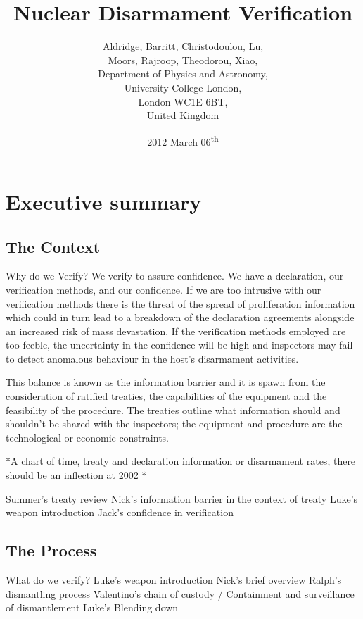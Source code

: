 \documentclass[a4paper]{article}
\begin{document}
\title{Nuclear Disarmament Verification}
\author{Aldridge, Barritt, Christodoulou, Lu, \\
	Moors, Rajroop, Theodorou, Xiao, \\
\small	Department of Physics and Astronomy, \\
\small	University College London, \\
\small	London WC1E 6BT, \\
\small	United Kingdom}
\date{2012 March 06\textsuperscript{th}}
\maketitle

\section*{Executive summary}
\subsection*{The Context}
Why do we Verify?
We verify to assure confidence. We have a declaration, our verification methods, 
and our confidence. If we are too intrusive with our verification methods there 
is the threat of the spread of proliferation information which could in turn lead 
to a breakdown of the declaration agreements alongside an increased risk of mass 
devastation. If the verification methods employed are too feeble, the uncertainty 
in the confidence will be high and inspectors may fail to detect anomalous 
behaviour in the host’s disarmament activities.

This balance is known as the information barrier and it is spawn from the 
consideration of ratified treaties, the capabilities of the equipment and the 
feasibility of the procedure. The treaties outline what information should and 
shouldn't be shared with the inspectors; the equipment and procedure are the 
technological or economic constraints.

*A chart of time, treaty and declaration information or disarmament rates, there 
should be an inflection at 2002 *

Summer's treaty review
Nick's information barrier in the context of treaty
Luke's weapon introduction
Jack's confidence in verification

\subsection*{The Process}
What do we verify?
Luke's weapon introduction
Nick's brief overview 
Ralph's dismantling process
Valentino's chain of custody / Containment and surveillance of dismantlement 
Luke's Blending down
\end{document}
